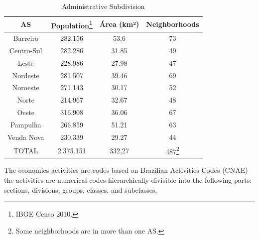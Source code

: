 \documentclass[12pt]{article}
\begin{document}
\begin{table}[H]
\begin{minipage}{\textwidth}
    \centering
    \vspace{3mm}
    \begin{tabular}{cccc}
AS & Population\footnote{IBGE Censo 2010.} & Área (km²) & Neighborhoods\\
\hline
Barreiro & 282.156 & 53.6 & 73\\
Centro-Sul & 282.286 & 31.85 & 49\\
Leste & 228.986 & 27.98 & 47\\
Nordeste & 281.507 & 39.46 & 69\\
Noroeste & 271.143 & 30.17 & 52\\
Norte & 214.967 & 32.67 & 48\\
Oeste & 316.908 & 36.06 & 67\\
Pampulha & 266.859 & 51.21 & 63\\
Venda Nova & 230.339 & 29.27 & 44\\
\hline
\hline
TOTAL & 2.375.151 & 332,27 & 487\footnote{Some neighborhoods are in more than one AS.}\\

    \end{tabular}
    \caption{Administrative Subdivision}
    \label{tab:regionais}
    \end{minipage}
\end{table}

The economics activities are codes based on Brazilian Activities Codes (CNAE) the activities are numerical codes hierarchically divisible into the following parts: sections, divisions, groups, classes, and subclasses.
\end{document}
